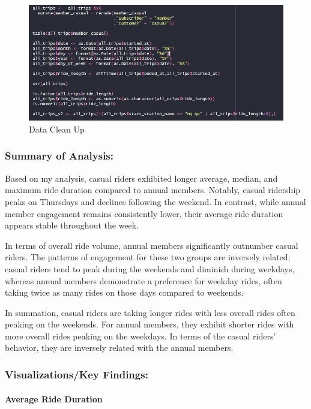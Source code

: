 \documentclass[
]{article}
\begin{document}
\begin{figure}
\centering
\includegraphics{Code_Image_2.png}
\caption{Data Clean Up}
\end{figure}

\subsubsection{Summary of Analysis:}\label{summary-of-analysis}

Based on my analysis, casual riders exhibited longer average, median,
and maximum ride duration compared to annual members. Notably, casual
ridership peaks on Thursdays and declines following the weekend. In
contrast, while annual member engagement remains consistently lower,
their average ride duration appears stable throughout the week.

In terms of overall ride volume, annual members significantly outnumber
casual riders. The patterns of engagement for these two groups are
inversely related; casual riders tend to peak during the weekends and
diminish during weekdays, whereas annual members demonstrate a
preference for weekday rides, often taking twice as many rides on those
days compared to weekends.

In summation, casual riders are taking longer rides with less overall
rides often peaking on the weekends. For annual members, they exhibit
shorter rides with more overall rides peaking on the weekdays. In terms
of the casual riders' behavior, they are inversely related with the
annual members.

\subsubsection{Visualizations/Key
Findings:}\label{visualizationskey-findings}

\paragraph{Average Ride Duration}\label{average-ride-duration}
\end{document}
